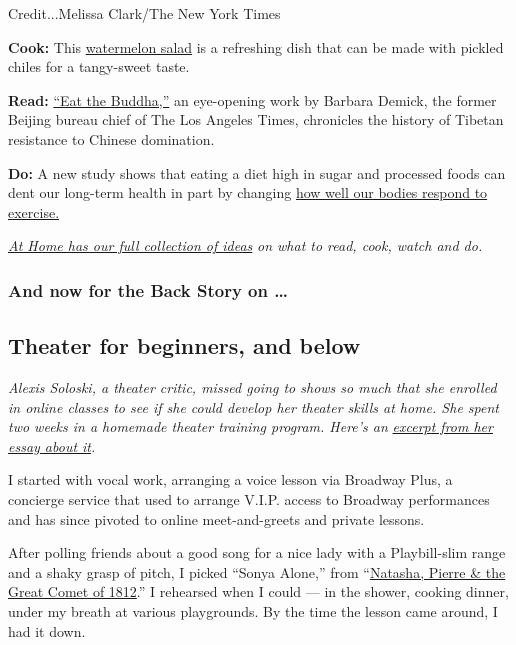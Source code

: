 Credit...Melissa Clark/The New York Times

\textbf{Cook:} This
\href{https://www.nytimes.com/2020/07/29/dining/watermelon-salad-recipe.html}{watermelon
salad} is a refreshing dish that can be made with pickled chiles for a
tangy-sweet taste.

\textbf{Read:}
\href{https://www.nytimes.com/2020/07/28/books/review/eat-the-buddha-barbara-demick.html}{``Eat
the Buddha,''} an eye-opening work by Barbara Demick, the former Beijing
bureau chief of The Los Angeles Times, chronicles the history of Tibetan
resistance to Chinese domination.

\textbf{Do:} A new study shows that eating a diet high in sugar and
processed foods can dent our long-term health in part by changing
\href{https://www.nytimes.com/2020/07/29/well/move/blood-sugar-diet-foods-workouts-exercise-muscles.html}{how
well our bodies respond to exercise.}

\href{https://www.nytimes.com/spotlight/at-home}{\emph{At Home has our
full collection of ideas}} \emph{on what to read, cook, watch and do.}

\hypertarget{and-now-for-the-back-story-on-}{%
\subsubsection{And now for the Back Story on
\ldots{}}\label{and-now-for-the-back-story-on-}}

\hypertarget{theater-for-beginners-and-below}{%
\subsection{Theater for beginners, and
below}\label{theater-for-beginners-and-below}}

\emph{Alexis Soloski, a theater critic, missed going to shows so much
that she enrolled in online classes to see if she could develop her
theater skills at home. She spent two weeks in a homemade theater
training program. Here's an}
\href{https://www.nytimes.com/2020/07/30/theater/theater-classes-at-home.html}{\emph{excerpt
from her essay about it}}\emph{.}

I started with vocal work, arranging a voice lesson via Broadway Plus, a
concierge service that used to arrange V.I.P. access to Broadway
performances and has since pivoted to online meet-and-greets and private
lessons.

After polling friends about a good song for a nice lady with a
Playbill-slim range and a shaky grasp of pitch, I picked ``Sonya
Alone,'' from
``\href{https://www.nytimes.com/2016/11/15/theater/natasha-pierre-and-the-great-comet-of-1812-review.html}{Natasha,
Pierre \& the Great Comet of 1812}.'' I rehearsed when I could --- in
the shower, cooking dinner, under my breath at various playgrounds. By
the time the lesson came around, I had it down.

